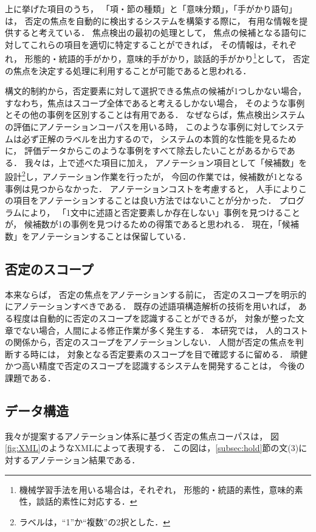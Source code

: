 \documentclass[japanese]{jnlp_1.4}
\begin{document}
上に挙げた項目のうち，
「項・節の種類」と「意味分類」，「手がかり語句」は，
否定の焦点を自動的に検出するシステムを構築する際に，
有用な情報を提供すると考えている．
焦点検出の最初の処理として，
焦点の候補となる語句に対してこれらの項目を適切に特定することができれば，
その情報は，それぞれ，
形態的・統語的手がかり，意味的手がかり，談話的手がかり\footnote{
機械学習手法を用いる場合は，それぞれ，
形態的・統語的素性，意味的素性，談話的素性に対応する．}として，
否定の焦点を決定する処理に利用することが可能であると思われる．

構文的制約から，否定要素に対して選択できる焦点の候補が1つしかない場合，
すなわち，焦点はスコープ全体であると考えるしかない場合，
そのような事例とその他の事例を区別することは有用である．
なぜならば，焦点検出システムの評価にアノテーションコーパスを用いる時，
このような事例に対してシステムは必ず正解のラベルを出力するので，
システムの本質的な性能を見るために，
評価データからこのような事例をすべて除去したいことがあるからである．
我々は，上で述べた項目に加え，
アノテーション項目として「候補数」を設計\footnote{
ラベルは，``1''か``複数''の2択とした．
}し，アノテーション作業を行ったが，
今回の作業では，候補数が1となる事例は見つからなかった．
アノテーションコストを考慮すると，
人手によりこの項目をアノテーションすることは良い方法ではないことが分かった．
プログラムにより，
「1文中に述語と否定要素しか存在しない」事例を見つけることが，
候補数が1の事例を見つけるための得策であると思われる．
現在，「候補数」をアノテーションすることは保留している．


\subsection{否定のスコープ}

本来ならば，
否定の焦点をアノテーションする前に，
否定のスコープを明示的にアノテーションすべきである．
既存の述語項構造解析の技術を用いれば，
ある程度は自動的に否定のスコープを認識することができるが，
対象が整った文章でない場合，人間による修正作業が多く発生する．
本研究では，
人的コストの関係から，否定のスコープをアノテーションしない．
人間が否定の焦点を判断する時には，
対象となる否定要素のスコープを目で確認するに留める．
頑健かつ高い精度で否定のスコープを認識するシステムを開発することは，
今後の課題である．


\subsection{データ構造}
\label{subsec:XML}

我々が提案するアノテーション体系に基づく否定の焦点コーパスは，
図\ref{fig:XML}のようなXMLによって表現する．
この図は，\ref{subsec:hold}節の文(3)に対するアノテーション結果である．
\end{document}
